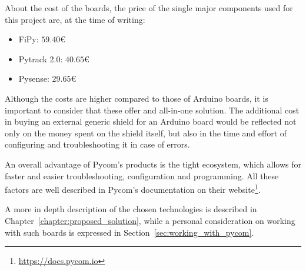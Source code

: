 			About the cost of the boards, the price of the single major components used for this project are, at the time of writing:
			\begin{itemize}
				\item FiPy: $59.40$€
				\item Pytrack 2.0: $40.65$€
				\item Pysense: $29.65$€
			\end{itemize}
			
			Although the costs are higher compared to those of Arduino boards, it is important to consider that these offer and all-in-one solution.
			The additional cost in buying an external generic shield for an Arduino board would be reflected not only on the money spent on the shield itself, but also in the time and effort of configuring and troubleshooting it in case of errors.
			
			An overall advantage of Pycom's products is the tight ecosystem, which allows for faster and easier troubleshooting, configuration and programming.
			All these factors are well described in Pycom's documentation on their website\footnote{ \url{https://docs.pycom.io}}.
			
			A more in depth description of the chosen technologies is described in Chapter~\ref{chapter:proposed_solution}, while a personal consideration on working with such boards is expressed in Section~\ref{sec:working_with_pycom}.